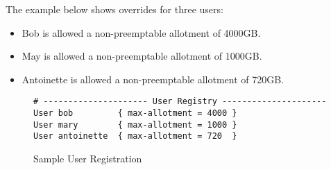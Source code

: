     The example below shows overrides for three users:
    \begin{itemize}
      \item Bob is allowed a non-preemptable allotment of 4000GB.
      \item May is allowed a non-preemptable allotment of 1000GB.
      \item Antoinette is allowed a non-preemptable allotment of 720GB.
    \end{itemize}    
        

    \begin{figure}[H]    
\begin{verbatim}
# --------------------- User Registry ---------------------
User bob         { max-allotment = 4000 }
User mary        { max-allotment = 1000 }
User antoinette  { max-allotment = 720  }
\end{verbatim}
          \caption{Sample User Registration}
      \label{fig:class.configuration}
    \end{figure}


